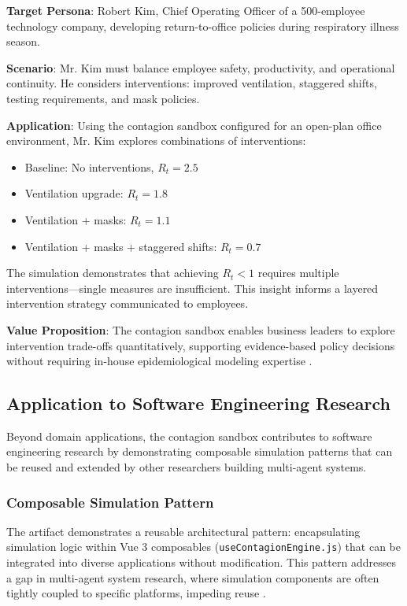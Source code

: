 \textbf{Target Persona}: Robert Kim, Chief Operating Officer of a 500-employee technology company, developing return-to-office policies during respiratory illness season.

\textbf{Scenario}: Mr. Kim must balance employee safety, productivity, and operational continuity. He considers interventions: improved ventilation, staggered shifts, testing requirements, and mask policies.

\textbf{Application}: Using the contagion sandbox configured for an open-plan office environment, Mr. Kim explores combinations of interventions:
\begin{itemize}
    \item Baseline: No interventions, $R_t = 2.5$
    \item Ventilation upgrade: $R_t = 1.8$
    \item Ventilation + masks: $R_t = 1.1$
    \item Ventilation + masks + staggered shifts: $R_t = 0.7$
\end{itemize}

The simulation demonstrates that achieving $R_t < 1$ requires multiple interventions---single measures are insufficient. This insight informs a layered intervention strategy communicated to employees.

\textbf{Value Proposition}: The contagion sandbox enables business leaders to explore intervention trade-offs quantitatively, supporting evidence-based policy decisions without requiring in-house epidemiological modeling expertise \cite{baker2021business}.

\subsection{Application to Software Engineering Research}

Beyond domain applications, the contagion sandbox contributes to software engineering research by demonstrating composable simulation patterns that can be reused and extended by other researchers building multi-agent systems.

\subsubsection{Composable Simulation Pattern}

The artifact demonstrates a reusable architectural pattern: encapsulating simulation logic within Vue 3 composables (\texttt{useContagionEngine.js}) that can be integrated into diverse applications without modification. This pattern addresses a gap in multi-agent system research, where simulation components are often tightly coupled to specific platforms, impeding reuse \cite{kravari2015survey}.

